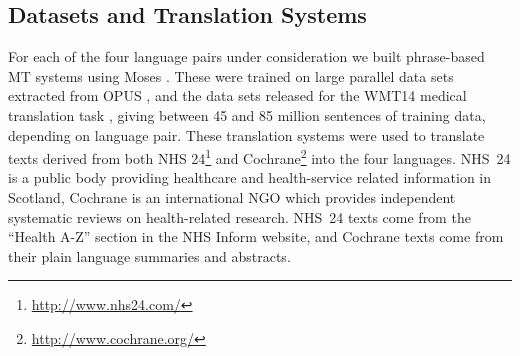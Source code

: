 \documentclass[11pt,letterpaper]{article}
\newcommand{\oa}[1]{\footnote{\color{red}OA: #1}}
\newcommand{\bh}[1]{\footnote{\color{blue}BH: #1}}
\def\parcite#1{\cite{#1}}
\begin{document}




\subsection{Datasets and Translation Systems}

For each of the four language pairs under consideration  we built phrase-based MT systems
using Moses \parcite{Koehn:2007}.  These were trained on large parallel data sets extracted from
OPUS \parcite{tiedemann:2009}, and the data sets released for the WMT14
medical translation task \parcite{bojar-EtAl:2014:W14-33}, 
giving between 45 and 85 million sentences of training data, depending on language pair.
These translation systems were used to translate texts derived from both NHS
24\footnote{\url{http://www.nhs24.com/}} and
Cochrane\footnote{\url{http://www.cochrane.org/}} into the four languages.
NHS~24 is a public body providing healthcare and health-service
related information in Scotland, Cochrane is an international NGO
which provides independent systematic reviews on health-related research.
NHS~24 texts come from the ``Health A-Z'' section in the NHS Inform
website, and Cochrane texts come from their plain language summaries
and abstracts.

\end{document}
